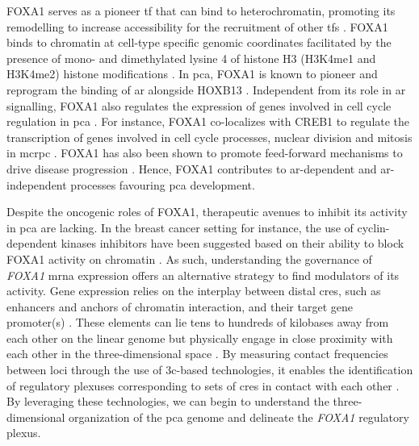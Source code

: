FOXA1 serves as a pioneer \gls{tf} that can bind to heterochromatin, promoting its remodelling to increase accessibility for the recruitment of other \glspl{tf} \cite{yangCurrentPerspectivesFOXA12015}.
FOXA1 binds to chromatin at cell-type specific genomic coordinates facilitated by the presence of mono- and dimethylated lysine 4 of histone H3 (H3K4me1 and H3K4me2) histone modifications \cite{lupienFoxA1TranslatesEpigenetic2008,eeckhouteCelltypeSelectiveChromatin2008}.
In \gls{pca}, FOXA1 is known to pioneer and reprogram the binding of \gls{ar} alongside HOXB13 \cite{pomerantzAndrogenReceptorCistrome2015}.
Independent from its role in \gls{ar} signalling, FOXA1 also regulates the expression of genes involved in cell cycle regulation in \gls{pca} \cite{imamuraFOXA1PromotesTumor2012,imamuraFOXA1PromotesTumor2012,xuAndrogensInduceProstate2006}.
For instance, FOXA1 co-localizes with CREB1 to regulate the transcription of genes involved in cell cycle processes, nuclear division and mitosis in \gls{mcrpc} \cite{imamuraFOXA1PromotesTumor2012,jinAndrogenReceptorIndependentFunction2013,xuAndrogensInduceProstate2006,yangFOXA1PotentiatesLineagespecific2016,zhangFOXA1DefinesCancer2016,augelloFOXA1MasterSteroid2011,sunkelIntegrativeAnalysisIdentifies2017}.
FOXA1 has also been shown to promote feed-forward mechanisms to drive disease progression \cite{niAmplitudeModulationAndrogen2013,sasseFeedforwardTranscriptionalProgramming2015}.
Hence, FOXA1 contributes to \gls{ar}-dependent and \gls{ar}-independent processes favouring \gls{pca} development.

Despite the oncogenic roles of FOXA1, therapeutic avenues to inhibit its activity in \gls{pca} are lacking.
In the breast cancer setting for instance, the use of cyclin-dependent kinases inhibitors have been suggested based on their ability to block FOXA1 activity on chromatin \cite{wangHighThroughputChemical2018}.
As such, understanding the governance of \emph{FOXA1} \gls{mrna} expression offers an alternative strategy to find modulators of its activity.
Gene expression relies on the interplay between distal \glspl{cre}, such as enhancers and anchors of chromatin interaction, and their target gene promoter(s) \cite{rowleyOrganizationalPrinciples3D2018}.
These elements can lie tens to hundreds of kilobases away from each other on the linear genome but physically engage in close proximity with each other in the three-dimensional space \cite{vernimmenHierarchyTranscriptionalActivation2015}.
By measuring contact frequencies between loci through the use of \gls{3c}-based technologies, it enables the identification of regulatory plexuses corresponding to sets of \glspl{cre} in contact with each other \cite{sallariConvergenceDispersedRegulatory2016,baileyNoncodingSomaticInherited2016}.
By leveraging these technologies, we can begin to understand the three-dimensional organization of the \gls{pca} genome and delineate the \emph{FOXA1} regulatory plexus.

